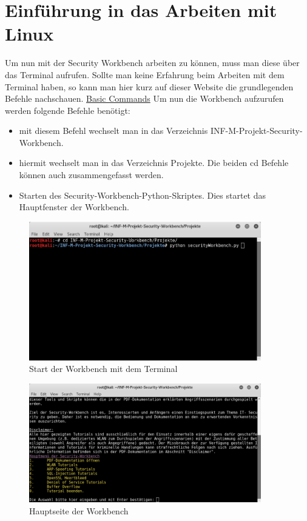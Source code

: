 \section{Einführung in das Arbeiten mit Linux}
\label{sec:startWorkbench}
Um nun mit der Security Workbench arbeiten zu können, muss man diese über das Terminal aufrufen.
Sollte man keine Erfahrung beim Arbeiten mit dem Terminal haben, so kann man hier kurz auf dieser Website die grundlegenden Befehle nachschauen.
\href{http://kali4hackers.blogspot.de/2013/06/some-basic-commands-for-kali-linux.html}{Basic Commands}
Um nun die Workbench aufzurufen werden folgende Befehle benötigt:
\begin{itemize}
	\item {} mit diesem Befehl wechselt man in das Verzeichnis INF-M-Projekt-Security-Workbench.
	\item {} hiermit wechselt man in das Verzeichnis Projekte. Die beiden cd Befehle können auch zusammengefasst werden. 
	\item {} Starten des Security-Workbench-Python-Skriptes. Dies startet das Hauptfenster der Workbench.
\end{itemize}

	\begin{figure}[H]
		\centering
		\includegraphics[width=0.9\textwidth]{images/prep/start_the_workbench.png}
		\caption{Start der Workbench mit dem Terminal}
		\label{fig:start workbench with terminal}
	\end{figure}

	\begin{figure}[H]
		\centering
		\includegraphics[width=0.9\textwidth]{images/prep/mainwindow_workbench.png}
		\caption{Hauptseite der Workbench}
		\label{fig:maindindow workbench}
	\end{figure}

